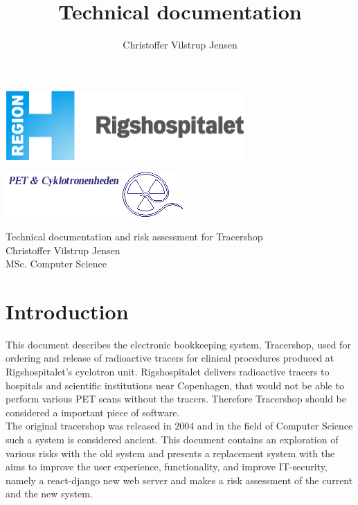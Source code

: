 \documentclass{article}
\author{Christoffer Vilstrup Jensen}
\title{Technical documentation}
\begin{document}
\begin{titlepage}
  \begin{minipage}{0.48\linewidth}
    \includegraphics[width=0.6\linewidth]{logo.png}
  \end{minipage}
  \begin{minipage}{0.48\linewidth}
    \raggedleft
      \includegraphics[width=0.6\linewidth]{petlogo_small.png}
  \end{minipage}
  \vspace{1cm}
  \begin{center}
    \Huge Technical documentation and risk assessment for Tracershop \\
    \vspace{1cm}
    \Large Christoffer Vilstrup Jensen\\
    MSc. Computer Science\\
  \end{center}
\end{titlepage}

\section*{Introduction}
This document describes the electronic bookkeeping system, Tracershop, used for ordering
and release of radioactive tracers for clinical procedures produced at Rigshospitalet's cyclotron unit.
Rigshospitalet delivers radioactive tracers to hospitals and scientific institutions near Copenhagen,
that would not be able to perform various PET scans without the tracers.
Therefore Tracershop should be considered a important piece of software.\\
The original tracershop was released in 2004 and in the field of Computer Science such a system is considered ancient.
This document contains an exploration of various risks with the old system and presents a replacement system with the aims to improve the user experience,
functionality, and improve IT-security, namely a react-django new web server and makes a risk assessment of the current and the new system.
\end{document}
